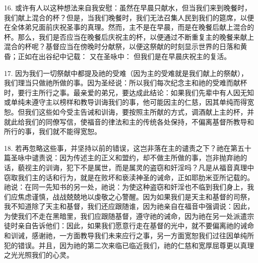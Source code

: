 16. 或许有人以这种想法来自我安慰：虽然在早晨只献水，但当我们来到晚餐时，我们献上混合的杯？但是，当我们晚餐时，我们无法召集人民到我们的筵席，以便在全体弟兄面前庆祝圣事的真理。然而，主不是在早晨，而是在晚餐后献上混合的杯。那么，我们是否应当在晚餐后庆祝主的杯，以便通过不断重复主的晚餐来献上混合的杯呢？基督应当在傍晚时分献祭，以便这祭献的时刻显示世界的日落和黄昏；正如在出谷纪中记载： 又在圣咏中： 但我们是在早晨庆祝主的复活。\par

17. 因为我们一切祭献中都提及祂的受难（因为主的受难就是我们献上的祭献），我们理当只做祂所做的事。因为圣经说：所以我们每次纪念主和祂的受难而献杯时，要行主所行之事。最亲爱的弟兄，要达成此结论：如果我们先辈中有人因无知或单纯未遵守主以榜样和教导训诲我们的事，他可能因主的仁慈，因其单纯而得宽恕。但我们这些如今受主告诫和训诲，要按照主所献的方式，调酒献上主的杯，并就此给我们的同僚写信，使福音的律法和主的传统各处保持，不偏离基督所教导和所行的事，我们就不能得宽恕。\par

18. 若再忽略这些事，并坚持以前的错误，这岂非落在主的谴责之下？祂在第五十篇圣咏中谴责说：因为传述主的正义和盟约，却不做主所做的事，岂非抛弃祂的话，藐视主的训诲，犯下不是属世，而是属灵的盗窃和奸淫吗？凡是从福音真理中窃取我们主的话和行为，就是在败坏和亵渎神圣的诫命，正如耶肋米亚所记载的。祂说：在同一先知书的另一处，祂说：为使这种盗窃和奸淫也不临到我们身上，我们应焦虑谨慎，战战兢兢地以虔敬之心警醒。因为如果我们是天主和基督的司祭，我不知道除了天主和基督，我们还应跟随谁，因为祂亲自在福音中强调说：因此，为使我们不走在黑暗里，我们应跟随基督，遵守祂的诫命，因为祂在另一处派遣宗徒时亲自告诉他们：因此，如果我们愿意行走在基督的光中，就不要偏离祂的诫命和训诫，感谢祂，一方面教导我们未来应行之事，另一方面宽恕我们过往因单纯所犯的错误。并且，因为祂的第二次来临已临近我们，祂的仁慈和宽厚屈尊更以真理之光光照我们的心灵。\par


